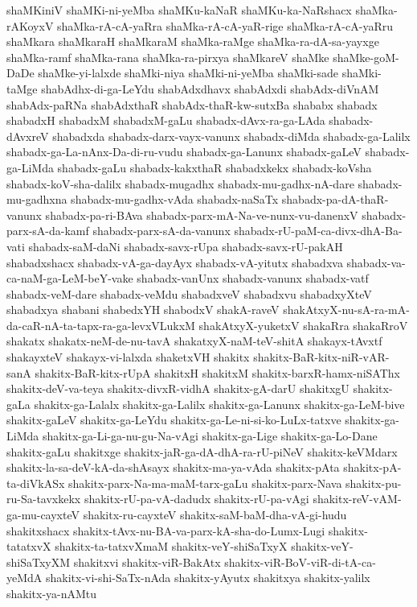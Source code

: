 {shaMKiniV
shaMKi-ni-yeMba
shaMKu-kaNaR
shaMKu-ka-NaRshacx
shaMka-rAKoyxV
shaMka-rA-cA-yaRra
shaMka-rA-cA-yaR-rige
shaMka-rA-cA-yaRru
shaMkara
shaMkaraH
shaMkaraM
shaMka-raMge
shaMka-ra-dA-sa-yayxge
shaMka-ramf
shaMka-rana
shaMka-ra-pirxya
shaMkareV
shaMke
shaMke-goM-DaDe
shaMke-yi-lalxde
shaMki-niya
shaMki-ni-yeMba
shaMki-sade
shaMki-taMge
shabAdhx-di-ga-LeYdu
shabAdxdhavx
shabAdxdi
shabAdx-diVnAM
shabAdx-paRNa
shabAdxthaR
shabAdx-thaR-kw-sutxBa
shababx
shabadx
shabadxH
shabadxM
shabadxM-gaLu
shabadx-dAvx-ra-ga-LAda
shabadx-dAvxreV
shabadxda
shabadx-darx-vayx-vanunx
shabadx-diMda
shabadx-ga-Lalilx
shabadx-ga-La-nAnx-Da-di-ru-vudu
shabadx-ga-Lanunx
shabadx-gaLeV
shabadx-ga-LiMda
shabadx-gaLu
shabadx-kakxthaR
shabadxkekx
shabadx-koVsha
shabadx-koV-sha-dalilx
shabadx-mugadhx
shabadx-mu-gadhx-nA-dare
shabadx-mu-gadhxna
shabadx-mu-gadhx-vAda
shabadx-naSaTx
shabadx-pa-dA-thaR-vanunx
shabadx-pa-ri-BAva
shabadx-parx-mA-Na-ve-nunx-vu-danenxV
shabadx-parx-sA-da-kamf
shabadx-parx-sA-da-vanunx
shabadx-rU-paM-ca-divx-dhA-Ba-vati
shabadx-saM-daNi
shabadx-savx-rUpa
shabadx-savx-rU-pakAH
shabadxshacx
shabadx-vA-ga-dayAyx
shabadx-vA-yitutx
shabadxva
shabadx-va-ca-naM-ga-LeM-beY-vake
shabadx-vanUnx
shabadx-vanunx
shabadx-vatf
shabadx-veM-dare
shabadx-veMdu
shabadxveV
shabadxvu
shabadxyXteV
shabadxya
shabani
shabedxYH
shabodxV
shakA-raveV
shakAtxyX-nu-sA-ra-mA-da-caR-nA-ta-tapx-ra-ga-levxVLukxM
shakAtxyX-yuketxV
shakaRra
shakaRroV
shakatx
shakatx-neM-de-nu-tavA
shakatxyX-naM-teV-shitA
shakayx-tAvxtf
shakayxteV
shakayx-vi-lalxda
shaketxVH
shakitx
shakitx-BaR-kitx-niR-vAR-sanA
shakitx-BaR-kitx-rUpA
shakitxH
shakitxM
shakitx-barxR-hamx-niSAThx
shakitx-deV-va-teya
shakitx-divxR-vidhA
shakitx-gA-darU
shakitxgU
shakitx-gaLa
shakitx-ga-Lalalx
shakitx-ga-Lalilx
shakitx-ga-Lanunx
shakitx-ga-LeM-bive
shakitx-gaLeV
shakitx-ga-LeYdu
shakitx-ga-Le-ni-si-ko-LuLx-tatxve
shakitx-ga-LiMda
shakitx-ga-Li-ga-nu-gu-Na-vAgi
shakitx-ga-Lige
shakitx-ga-Lo-Dane
shakitx-gaLu
shakitxge
shakitx-jaR-ga-dA-dhA-ra-rU-piNeV
shakitx-keVMdarx
shakitx-la-sa-deV-kA-da-shAsayx
shakitx-ma-ya-vAda
shakitx-pAta
shakitx-pA-ta-diVkASx
shakitx-parx-Na-ma-maM-tarx-gaLu
shakitx-parx-Nava
shakitx-pu-ru-Sa-tavxkekx
shakitx-rU-pa-vA-dadudx
shakitx-rU-pa-vAgi
shakitx-reV-vAM-ga-mu-cayxteV
shakitx-ru-cayxteV
shakitx-saM-baM-dha-vA-gi-hudu
shakitxshacx
shakitx-tAvx-nu-BA-va-parx-kA-sha-do-Lumx-Lugi
shakitx-tatatxvX
shakitx-ta-tatxvXmaM
shakitx-veY-shiSaTxyX
shakitx-veY-shiSaTxyXM
shakitxvi
shakitx-viR-BakAtx
shakitx-viR-BoV-viR-di-tA-ca-yeMdA
shakitx-vi-shi-SaTx-nAda
shakitx-yAyutx
shakitxya
shakitx-yalilx
shakitx-ya-nAMtu
}
